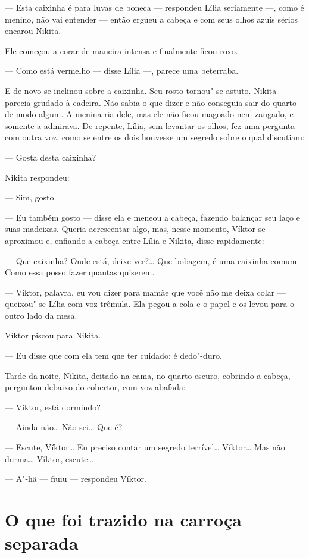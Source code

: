 --- Esta caixinha é para luvas de boneca --- respondeu Lília seriamente
---, como é menino, não vai entender --- então ergueu a cabeça e com
seus olhos azuis sérios encarou Nikita.

Ele começou a corar de maneira intensa e finalmente ficou roxo.

--- Como está vermelho --- disse Lília ---, parece uma beterraba.

E de novo se inclinou sobre a caixinha. Seu rosto tornou"-se astuto.
Nikita parecia grudado à cadeira. Não sabia o que dizer e não conseguia
sair do quarto de modo algum. A menina ria dele, mas ele não ficou
magoado nem zangado, e somente a admirava. De repente, Lília, sem
levantar os olhos, fez uma pergunta com outra voz, como se entre os dois
houvesse um segredo sobre o qual discutiam:

--- Gosta desta caixinha?

Nikita respondeu:

--- Sim, gosto.

--- Eu também gosto --- disse ela e meneou a cabeça, fazendo balançar
seu laço e suas madeixas. Queria acrescentar algo, mas, nesse momento,
Víktor se aproximou e, enfiando a cabeça entre Lília e Nikita, disse
rapidamente:

--- Que caixinha? Onde está, deixe ver?\ldots{} Que bobagem, é uma caixinha
comum. Como essa posso fazer quantas quiserem.

--- Víktor, palavra, eu vou dizer para mamãe que você não me deixa colar
--- queixou"-se Lília com voz trêmula. Ela pegou a cola e o papel e os
levou para o outro lado da mesa.

Víktor piscou para Nikita.

--- Eu disse que com ela tem que ter cuidado: é dedo"-duro.

Tarde da noite, Nikita, deitado na cama, no quarto escuro, cobrindo a
cabeça, perguntou debaixo do cobertor, com voz abafada:

--- Víktor, está dormindo?

--- Ainda não\ldots{} Não sei\ldots{} Que é?

--- Escute, Víktor\ldots{} Eu preciso contar um segredo terrível\ldots{} Víktor\ldots{}
Mas não durma\ldots{} Víktor, escute\ldots{}

--- A"-hã --- fiuiu --- respondeu Víktor.

\chapter{O que foi trazido na carroça separada}

